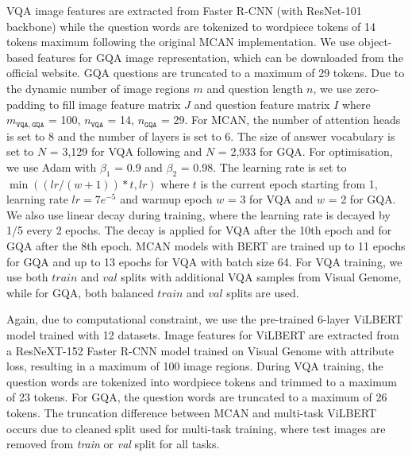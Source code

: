 \documentclass{article}
\begin{document}
VQA image features are extracted from Faster R-CNN (with ResNet-101 backbone) while the question words are tokenized to wordpiece tokens of 14 tokens maximum following the original MCAN implementation. We use object-based features for GQA image representation, which can be downloaded from the official website. %
GQA questions are truncated to a maximum of 29 tokens. Due to the dynamic number of image regions $m$ and question length $n$, we use zero-padding to fill image feature matrix $J$ and question feature matrix $I$ where $m_{\mathtt{VQA},\mathtt{GQA}}$ = 100, $n_{\mathtt{VQA}}$ = 14, $n_{\mathtt{GQA}}$ = 29. For MCAN, the number of attention heads is set to 8 and the number of layers is set to 6. The size of answer vocabulary is set to $N$ = 3,129 for VQA following \citet{yu2019mcan} and $N$ = 2,933 for GQA. For optimisation, we use Adam \citep{kingma2014adam} with $\beta_{1}$ = 0.9 and $\beta_{2}$ = 0.98. The learning rate is set to $\min( (lr/(w+1)) * t, lr)$ where $t$ is the current epoch starting from 1, learning rate $lr = 7e^{-5}$ and warmup epoch $w$ = 3 for VQA and $w$ = 2 for GQA. We also use linear decay during training, where the learning rate is decayed by 1/5 every 2 epochs. The decay is applied for VQA after the 10th epoch and for GQA after the 8th epoch. MCAN models with BERT are trained up to 11 epochs for GQA and up to 13 epochs for VQA with batch size 64. For VQA training, we use both $train$ and $val$ splits with additional VQA samples from Visual Genome, while for GQA, both balanced $train$ and $val$ splits are used.

Again, due to computational constraint, we use the pre-trained 6-layer ViLBERT model trained with 12 datasets. Image features for ViLBERT are extracted from a ResNeXT-152 \citep{Xie2016} Faster R-CNN model trained on Visual Genome with attribute loss, resulting in a maximum of 100 image regions. During VQA training, the question words are tokenized into wordpiece tokens and trimmed to a maximum of 23 tokens. For GQA, the question words are truncated to a maximum of 26 tokens. The truncation difference between MCAN and multi-task ViLBERT occurs due to cleaned split used for multi-task training, where test images are removed from \textit{train} or \textit{val} split for all tasks.

\end{document}
